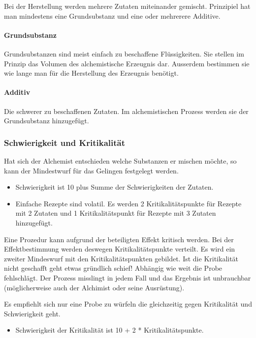 \documentclass{article}
\begin{document}
Bei der Herstellung werden mehrere Zutaten miteinander gemischt. Prinzipiel hat man mindestens eine Grundsubstanz und
eine oder mehrerere Additive.

\paragraph{Grundsubstanz}

Grundsubstanzen sind meist einfach zu beschaffene Flüssigkeiten. Sie stellen im Prinzip das Volumen des
alchemistische Erzeugnis dar. Ausserdem bestimmen sie wie lange man für die Herstellung des Erzeugnis benötigt.

\paragraph{Additiv}

Die schwerer zu beschaffenen Zutaten. Im alchemistischen Prozess werden sie der Grundsubstanz hinzugefügt.

\subsubsection{Schwierigkeit und Kritikalität}

Hat sich der Alchemist entschieden welche Substanzen er mischen möchte, so kann der Mindestwurf für das Gelingen
festgelegt werden.

\begin{itemize}
\item Schwierigkeit ist 10 plus Summe der Schwierigkeiten der Zutaten.
\item Einfache Rezepte sind volatil. Es werden 2 Kritikalitätspunkte für Rezepte mit 2 Zutaten und 1 Kritikalitätspunkt für Rezepte mit 3 Zutaten hinzugefügt.
\end{itemize}

Eine Prozedur kann aufgrund der beteiligten Effekt kritisch werden. Bei der Effektbestimmung werden deswegen
Kritikalitätspunkte verteilt. Es wird ein zweiter Mindeswurf mit den Kritikalitätspunkten gebildet. Ist die
Kritikalität nicht geschafft geht etwas gründlich schief! Abhängig wie weit die Probe fehlschlägt. Der Prozess
misslingt in jedem Fall und das Ergebnis ist unbrauchbar (möglicherweise auch der Alchimist oder seine Ausrüstung).

Es empfiehlt sich nur eine Probe zu würfeln die gleichzeitig gegen Kritikalität und Schwierigkeit
geht.

\begin{itemize}
\item Schwierigkeit der Kritikalität ist 10 + 2 * Kritikalitätspunkte.
\end{itemize}
\end{document}
